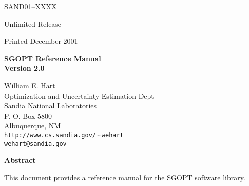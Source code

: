 \documentclass[10pt]{article}
\begin{document}
\pagestyle{empty}
\setcounter{page}{2}

\begin{center}
SAND01--XXXX

Unlimited Release

Printed December 2001
\end{center}

\vspace{0.8in}

\begin{center}
{\bf \LARGE SGOPT Reference Manual\\[1ex]\Large Version 2.0}
\vspace*{0.4in}

William E. Hart\\
Optimization and Uncertainty Estimation Dept\\
Sandia National Laboratories\\
P. O. Box 5800\\
Albuquerque, NM\\
{\tt http://www.cs.sandia.gov/$\sim$wehart}\\
{\tt wehart@sandia.gov}\\

\vspace*{1.0in}

{\bf\large Abstract}
\end{center}
This document provides a reference manual for the SGOPT software library.


\vfill
\newpage


\newpage

\tableofcontents
\clearemptydoublepage

\end{document}
